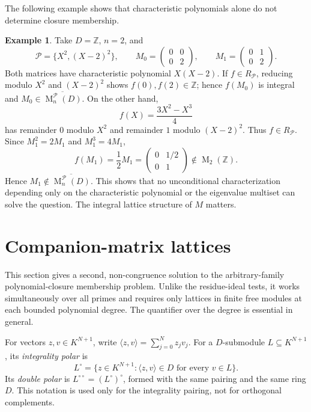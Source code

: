 \documentclass[11pt]{amsart}
\theoremstyle{definition}
\newtheorem{example}[theorem]{Example}
\theoremstyle{remark}
\newcommand{\Mat}{\operatorname{M}}
\begin{document}
The following example shows that characteristic polynomials alone do not determine closure membership.
\begin{example}
Take $D=\mathbb Z$, $n=2$, and
\[
\mathcal P=\{X^2,(X-2)^2\},\qquad
M_0=\begin{pmatrix}0&0\\0&2\end{pmatrix},\qquad
M_1=\begin{pmatrix}0&1\\0&2\end{pmatrix}.
\]
Both matrices have characteristic polynomial $X(X-2)$.
If $f\in R_{\mathcal P}$, reducing modulo $X^2$ and $(X-2)^2$
shows $f(0),f(2)\in\mathbb Z$; hence $f(M_0)$ is integral and
$M_0\in\overline{\Mat_n^{\mathcal P}(D)}$.
On the other hand,
\[
f(X)=\frac{3X^2-X^3}{4}
\]
has remainder $0$ modulo $X^2$ and remainder $1$ modulo
$(X-2)^2$. Thus $f\in R_{\mathcal P}$.
Since $M_1^2=2M_1$ and $M_1^3=4M_1$,
\[
f(M_1)=\frac12M_1=
\begin{pmatrix}0&1/2\\0&1\end{pmatrix}\notin\Mat_2(\mathbb Z).
\]
Hence $M_1\notin\overline{\Mat_n^{\mathcal P}(D)}$.
This shows that no unconditional characterization depending only on the
characteristic polynomial or the eigenvalue multiset can solve the question.
The integral lattice structure of $M$ matters.
\end{example}

\section{Companion-matrix lattices}
\label{sec:moments}
This section gives a second, non-congruence solution to the arbitrary-family
polynomial-closure membership problem.  Unlike the residue-ideal tests, it
works simultaneously over all primes and requires only lattices in finite
free modules at each bounded polynomial degree.  The quantifier over the
degree is essential in general.

For vectors $z,v\in K^{N+1}$, write
$\langle z,v\rangle=\sum_{j=0}^{N}z_jv_j$. For a $D$-submodule
$L\subseteq K^{N+1}$, its \emph{integrality polar} is
\[
 L^\circ=\{z\in K^{N+1}:\langle z,v\rangle\in D
                    \text{ for every }v\in L\}.
\]
Its \emph{double polar} is $L^{\circ\circ}=(L^\circ)^\circ$,
formed with the same pairing and the same ring $D$. This notation
is used only for the integrality pairing, not for orthogonal complements.
\end{document}
